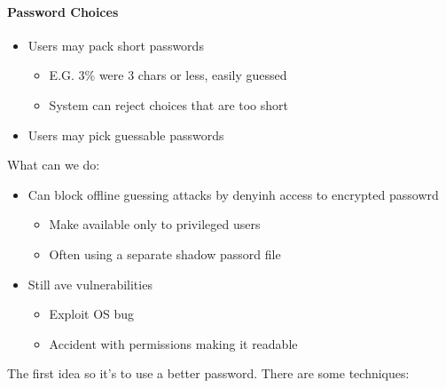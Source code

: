 \paragraph*{Password Choices}
\begin{itemize}
  \item Users may pack short passwords
  \begin{itemize}
    \item E.G. 3\% were 3 chars or less, easily guessed
    \item System can reject choices that are too short
  \end{itemize}
  \item Users may pick guessable passwords
\end{itemize}
What can we do:
\begin{itemize}
  \item Can block offline guessing attacks by denyinh access to encrypted
passowrd
  \begin{itemize}
    \item Make available only to privileged users
    \item Often using a separate shadow passord file
  \end{itemize}
  \item Still ave vulnerabilities
  \begin{itemize}
    \item Exploit OS bug
    \item Accident with permissions making it readable
  \end{itemize}
\end{itemize}
The first idea so it's to use a better password. There are some techniques:
